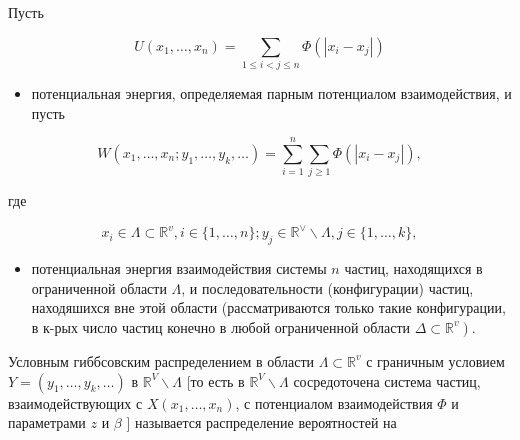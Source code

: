 \documentclass[10pt]{article}
\begin{document}
Пусть



\[

U\left(x_{1}, \ldots, x_{n}\right)=\sum_{1 \leqslant i<j \leqslant n} \Phi\left(\left|x_{i}-x_{j}\right|\right)

\]



\begin{itemize}

  \item потенциальная энергия, определяемая парным потенциалом взаимодействия, и пусть

\end{itemize}



\[

W\left(x_{1}, \ldots, x_{n} ; y_{1}, \ldots, y_{k}, \ldots\right)=\sum_{i=1}^{n} \sum_{j \geqslant 1} \Phi\left(\left|x_{i}-x_{j}\right|\right),

\]



где



\[

x_{i} \in \Lambda \subset \mathbb{R}^{v}, i \in\{1, \ldots, n\} ; y_{j} \in \mathbb{R}^{\vee} \backslash \Lambda, j \in\{1, \ldots, k\},

\]



\begin{itemize}

  \item потенциальная энергия взаимодействия системы $n$ частиц, находящихся в ограниченной области $\Lambda$, и последовательности (конфигурации) частиц, находяшихся вне этой области (рассматриваются только такие конфигурации, в к-рых число частиц конечно в любой ограниченной области $\left.\Delta \subset \mathbb{R}^{v}\right)$.

\end{itemize}



Условным гиббсовским распределением в области $\Lambda \subset \mathbb{R}^{v}$ с граничным условием $Y=\left(y_{1}, \ldots, y_{k}, \ldots\right)$ в $\mathbb{R}^{V} \backslash \Lambda$ [то есть в $\mathbb{R}^{V} \backslash \Lambda$ сосредоточена система частиц, взаимодействующих с $X\left(x_{1}, \ldots, x_{n}\right)$, с потенциалом взаимодействия $\Phi$ и параметрами $z$ и $\beta$ ] называется распределение вероятностей на
\end{document}
